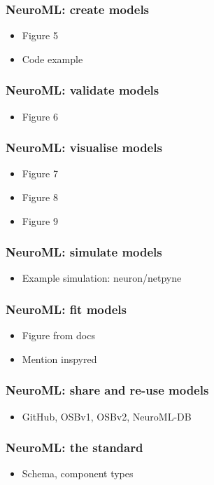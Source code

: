 \begin{frame}[c]
  \frametitle{NeuroML: create models}
  \begin{itemize}
    \item Figure 5
    \item Code example
  \end{itemize}
\end{frame}
\begin{frame}[c]
  \frametitle{NeuroML: validate models}
  \begin{itemize}
    \item Figure 6
  \end{itemize}
\end{frame}
\begin{frame}[c]
  \frametitle{NeuroML: visualise models}
  \begin{itemize}
    \item Figure 7
    \item Figure 8
    \item Figure 9
  \end{itemize}
\end{frame}
\begin{frame}[c]
  \frametitle{NeuroML: simulate models}
  \begin{itemize}
    \item Example simulation: neuron/netpyne
  \end{itemize}
\end{frame}
\begin{frame}[c]
  \frametitle{NeuroML: fit models}
  \begin{itemize}
    \item Figure from docs
    \item Mention inspyred
  \end{itemize}
\end{frame}
\begin{frame}[c]
  \frametitle{NeuroML: share and re-use models}
  \begin{itemize}
    \item GitHub, OSBv1, OSBv2, NeuroML-DB
  \end{itemize}
\end{frame}
\begin{frame}[c]
  \frametitle{NeuroML: the standard}
  \begin{itemize}
    \item Schema, component types
  \end{itemize}
\end{frame}
